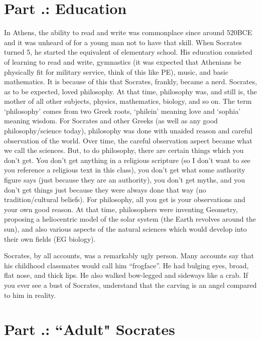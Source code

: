 \section{Part \thechapcount.\theseccount: Education}

In Athens, the ability to read and write was commonplace since around 520BCE and it was unheard of for a young man not to have that skill. When Socrates turned 5, he started the equivalent of elementary school. His education consisted of learning to read and write, gymnastics (it was expected that Athenians be physically fit for military service, think of this like PE), music, and basic mathematics. It is because of this that Socrates, frankly, became a nerd. Socrates, as to be expected, loved philosophy. At that time, philosophy was, and still is, the mother of all other subjects, physics, mathematics, biology, and so on. The term `philosophy' comes from two Greek roots, `philein' meaning love and `sophia' meaning wisdom. For Socrates and other Greeks (as well as any good philosophy/science today), philosophy was done with unaided reason and careful observation of the world. Over time, the careful observation aspect became what we call the sciences. But, to do philosophy, there are certain things which you don't get. You don't get anything in a religious scripture (so I don't want to see you reference a religious text in this class), you don't get what some authority figure says (just because they are an authority), you don't get myths, and you don't get things just because they were always done that way (no tradition/cultural beliefs). For philosophy, all you get is your observations and your own good reason. At that time, philosophers were inventing Geometry, proposing a heliocentric model of the solar system (the Earth revolves around the sun), and also various aspects of the natural sciences which would develop into their own fields (EG biology).

Socrates, by all accounts, was a remarkably ugly person. Many accounts say that his childhood classmates would call him “frogface”. He had bulging eyes, broad, flat nose, and thick lips. He also walked bow-legged and sideways like a crab. If you ever see a bust of Socrates, understand that the carving is an angel compared to him in reality.
\section{Part \thechapcount.\theseccount: “Adult" Socrates}

